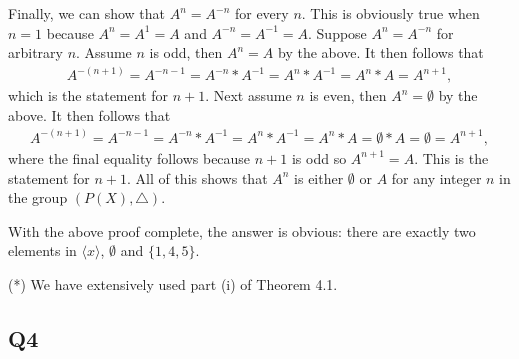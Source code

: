 \documentclass[12pt]{article}
\numberwithin{theorem}{section}
\numberwithin{equation}{section}
\numberwithin{remark}{section}
\numberwithin{definition}{section}
\numberwithin{theorem}{section}
\numberwithin{lemma}{section}
\numberwithin{example}{section}
\begin{document}
Finally, we can show that $A^n=A^{-n}$ for every $n$. This is obviously true when $n=1$ because $A^n=A^1=A$ and $A^{-n}=A^{-1}=A$. Suppose $A^n=A^{-n}$ for arbitrary $n$. Assume $n$ is odd, then $A^n=A$ by the above. It then follows that
\begin{align*}
	A^{-(n+1)}=A^{-n-1}=A^{-n}*A^{-1}=A^n*A^{-1}=A^n*A=A^{n+1},
\end{align*}
which is the statement for $n+1$. Next assume $n$ is even, then $A^n=\emptyset$ by the above. It then follows that 
\begin{align*}
	A^{-(n+1)}=A^{-n-1}=A^{-n}*A^{-1}=A^n*A^{-1}=A^n*A=\emptyset*A=\emptyset = A^{n+1},
\end{align*}
where the final equality follows because $n+1$ is odd so $A^{n+1}=A$. This is the statement for $n+1$. All of this shows that $A^n$ is either $\emptyset$ or $A$ for any integer $n$ in the group $\left(P(X),\triangle\right)$. 

With the above proof complete, the answer is obvious: there are exactly two elements in $\langle x \rangle$, $\emptyset$ and $\{1,4,5\}$. 

\vspace{\baselineskip}

\noindent (*) We have extensively used part (i) of Theorem 4.1.



\subsection{Q4}
\end{document}
